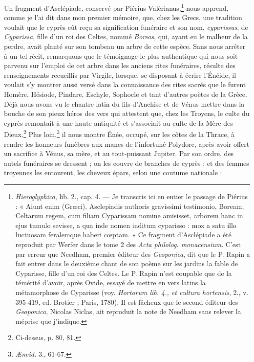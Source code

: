 \documentclass{article}
\begin{document}
Un fragment d'Asclépiade, conservé par Piérius Valérianus,\footnote{\emph{Hieroglyphica}, lib. 2., cap. 4. --- Je transcris ici en entier le passage de Piérius : « Aiunt enim (Græci), Asclepiadis authoris gravissimi testimonio, Boream, Celtarum regem, cum filiam Cyparissam nomine amisisset, arborem hanc in ejus tumulo sevisse, a qua inde nomen inditum cyparisso : mox a satu illo luctuosam feralemque haberi cœptam. » Ce fragment d'Asclépiade a été reproduit par Werfer dans le tome 2 des \emph{Acta philolog. monacensium}. C'est par erreur que Needham, premier éditeur des \emph{Geoponica}, dit que le P. Rapin a fait entrer dans le deuxième chant de son poème sur les jardins la fable de Cyparisse, fille d'un roi des Celtes. Le P. Rapin n'est coupable que de la témérité d'avoir, après Ovide, essayé de mettre en vers latins la métamorphose de Cyparisse (voy. \emph{Hortorum lib. 4., et cultura hortensis}, 2., v. 395-419, ed. Brotier ; Paris, 1780). Il est fâcheux que le second éditeur des \emph{Geoponica}, Nicolas Niclas, ait reproduit la note de Needham sans relever la méprise que j'indique.} nous apprend, comme je l'ai dit dans mon premier mémoire, que, chez les Grecs, une tradition voulait que le cyprès eût reçu sa signification funéraire et son nom, \emph{cyparissus}, de \emph{Cyparissa}, fille d'un roi des Celtes, nommé \emph{Boreas}, qui, ayant eu le malheur de la perdre, avait planté sur son tombeau un arbre de cette espèce. Sans nous arrêter à un tel récit, remarquons que le témoignage le plus authentique qui nous soit parvenu sur l'emploi de cet arbre dans les anciens rites funéraires, résulte des renseignements recueillis par Virgile, lorsque, se disposant à écrire l'Énéide, il voulait s'y montrer aussi versé dans la connaissance des rites sacrés que le furent Homère, Hésiode, Pindare, Eschyle, Sophocle et tant d'autres poètes de la Grèce. Déjà nous avons vu le chantre latin du fils d'Anchise et de Vénus mettre dans la bouche de son pieux héros des vers qui attestent que, chez les Troyens, le culte du cyprès remontait à une haute antiquité et s'associait au culte de la Mère des Dieux.\footnote{Ci-dessus, p. 80, 81.} Plus loin,\footnote{\emph{Æneid.} 3., 61-67.} il nous montre Énée, occupé, sur les côtes de la Thrace, à rendre les honneurs funèbres aux manes de l'infortuné Polydore, après avoir offert un sacrifice à Vénus, sa mère, et au tout-puissant Jupiter. Par son ordre, des autels funéraires se dressent ; on les couvre de branches de cyprès ; et des femmes troyennes les entourent, les cheveux épars, selon une coutume nationale :
\end{document}
